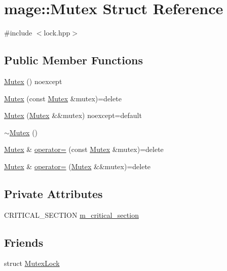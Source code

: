 \hypertarget{structmage_1_1_mutex}{}\section{mage\+:\+:Mutex Struct Reference}
\label{structmage_1_1_mutex}


{\ttfamily \#include $<$lock.\+hpp$>$}

\subsection*{Public Member Functions}
\begin{DoxyCompactItemize}
\item 
\hyperlink{structmage_1_1_mutex_a7d91a1e59c8d99dfbe2087d3a4a4bf6a}{Mutex} () noexcept
\item 
\hyperlink{structmage_1_1_mutex_af1c2c7d0134ba853903522d2f3684f22}{Mutex} (const \hyperlink{structmage_1_1_mutex}{Mutex} \&mutex)=delete
\item 
\hyperlink{structmage_1_1_mutex_a0892548844c742d75942b3a4ee85a90d}{Mutex} (\hyperlink{structmage_1_1_mutex}{Mutex} \&\&mutex) noexcept=default
\item 
\hyperlink{structmage_1_1_mutex_a143d82ec7bb43f953a1703caa7972e9d}{$\sim$\+Mutex} ()
\item 
\hyperlink{structmage_1_1_mutex}{Mutex} \& \hyperlink{structmage_1_1_mutex_a56072bdabdeadd5d897de232dbd298a0}{operator=} (const \hyperlink{structmage_1_1_mutex}{Mutex} \&mutex)=delete
\item 
\hyperlink{structmage_1_1_mutex}{Mutex} \& \hyperlink{structmage_1_1_mutex_aaef0078f5b70afb0e5a290a5b5f33680}{operator=} (\hyperlink{structmage_1_1_mutex}{Mutex} \&\&mutex)=delete
\end{DoxyCompactItemize}
\subsection*{Private Attributes}
\begin{DoxyCompactItemize}
\item 
C\+R\+I\+T\+I\+C\+A\+L\+\_\+\+S\+E\+C\+T\+I\+ON \hyperlink{structmage_1_1_mutex_a18414337aef28b7ed261e7a805d2c103}{m\+\_\+critical\+\_\+section}
\end{DoxyCompactItemize}
\subsection*{Friends}
\begin{DoxyCompactItemize}
\item 
struct \hyperlink{structmage_1_1_mutex_a058473d070063e5098732f355f432bd9}{Mutex\+Lock}
\end{DoxyCompactItemize}


